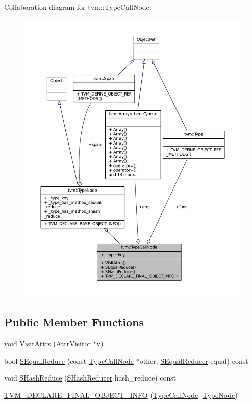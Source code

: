 Collaboration diagram for tvm\+:\+:Type\+Call\+Node\+:
\nopagebreak
\begin{figure}[H]
\begin{center}
\leavevmode
\includegraphics[width=350pt]{classtvm_1_1TypeCallNode__coll__graph}
\end{center}
\end{figure}
\subsection*{Public Member Functions}
\begin{DoxyCompactItemize}
\item 
void \hyperlink{classtvm_1_1TypeCallNode_a78d868b71e85155ef0b9a003bab87a77}{Visit\+Attrs} (\hyperlink{classtvm_1_1AttrVisitor}{Attr\+Visitor} $\ast$v)
\item 
bool \hyperlink{classtvm_1_1TypeCallNode_adcd169de4a8923b333f721d5c79dcbc5}{S\+Equal\+Reduce} (const \hyperlink{classtvm_1_1TypeCallNode}{Type\+Call\+Node} $\ast$other, \hyperlink{classtvm_1_1SEqualReducer}{S\+Equal\+Reducer} equal) const 
\item 
void \hyperlink{classtvm_1_1TypeCallNode_ad26289590f6b21bdf772529ed56d1f0c}{S\+Hash\+Reduce} (\hyperlink{classtvm_1_1SHashReducer}{S\+Hash\+Reducer} hash\+\_\+reduce) const 
\item 
\hyperlink{classtvm_1_1TypeCallNode_ae2a79cdbb7b42224f49d18f5e559e1f0}{T\+V\+M\+\_\+\+D\+E\+C\+L\+A\+R\+E\+\_\+\+F\+I\+N\+A\+L\+\_\+\+O\+B\+J\+E\+C\+T\+\_\+\+I\+N\+FO} (\hyperlink{classtvm_1_1TypeCallNode}{Type\+Call\+Node}, \hyperlink{classtvm_1_1TypeNode}{Type\+Node})
\end{DoxyCompactItemize}
